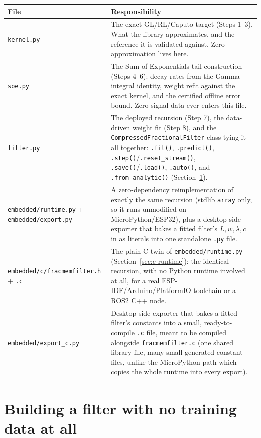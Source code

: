\documentclass[11pt]{article}
\begin{document}
\begin{center}
\small
\begin{tabularx}{\textwidth}{lX}
\toprule
File & Responsibility \\
\midrule
\texttt{kernel.py} & The exact GL/RL/Caputo target (Steps 1--3). What the library approximates, and the reference it is validated against. Zero approximation lives here. \\
\texttt{soe.py} & The Sum-of-Exponentials tail construction (Steps 4--6): decay rates from the Gamma-integral identity, weight refit against the exact kernel, and the certified offline error bound. Zero signal data ever enters this file. \\
\texttt{filter.py} & The deployed recursion (Step 7), the data-driven weight fit (Step 8), and the \texttt{CompressedFractionalFilter} class tying it all together: \texttt{.fit()}, \texttt{.predict()}, \texttt{.step()}/\texttt{.reset\_stream()}, \texttt{.save()}/\texttt{.load()}, \texttt{.auto()}, and \texttt{.from\_analytic()} (Section~\ref{sec:no-training-data}). \\
\texttt{embedded/runtime.py} + \texttt{embedded/export.py} & A zero-dependency reimplementation of exactly the same recursion (stdlib \texttt{array} only, so it runs unmodified on MicroPython/ESP32), plus a desktop-side exporter that bakes a fitted filter's $L,w,\lambda,c$ in as literals into one standalone \texttt{.py} file. \\
\texttt{embedded/c/fracmemfilter.h} + \texttt{.c} & The plain-C twin of \texttt{embedded/runtime.py} (Section~\ref{sec:c-runtime}): the identical recursion, with no Python runtime involved at all, for a real ESP-IDF/Arduino/PlatformIO toolchain or a ROS2 C++ node. \\
\texttt{embedded/export\_c.py} & Desktop-side exporter that bakes a fitted filter's constants into a small, ready-to-compile \texttt{.c} file, meant to be compiled alongside \texttt{fracmemfilter.c} (one shared library file, many small generated constant files, unlike the MicroPython path which copies the whole runtime into every export). \\
\bottomrule
\end{tabularx}
\end{center}

\section{Building a filter with no training data at all}
\label{sec:no-training-data}
\end{document}
